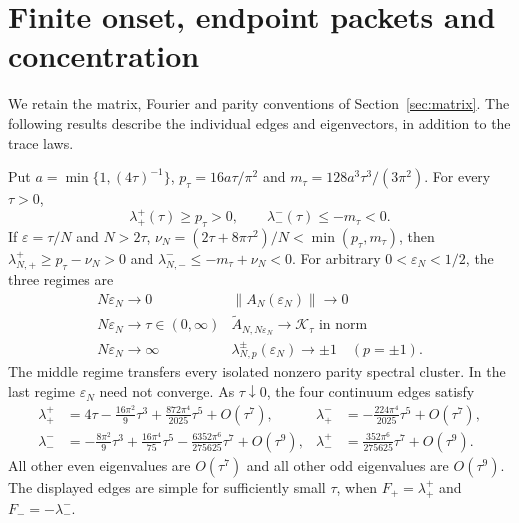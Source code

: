 \section{Finite onset, endpoint packets and concentration}
\label{sec:packets}\label{sec:thirdregime}

We retain the matrix, Fourier and parity conventions of
Section~\ref{sec:matrix}. The following results describe the individual
edges and eigenvectors, in addition to the trace laws.

\begin{theorem}
\label{thm:signed-bounds}\label{cor:sharp}
Put $a=\min\{1,(4\tau)^{-1}\}$,
$p_\tau=16a\tau/\pi^2$ and $m_\tau=128a^3\tau^3/(3\pi^2)$.
For every $\tau>0$,
\begin{equation}\label{eq:3.7}
 \lambda_+^+(\tau)\ge p_\tau>0,\qquad
 \lambda_-^-(\tau)\le-m_\tau<0.
\end{equation}
If $\varepsilon=\tau/N$ and
$N>2\tau$, $\nu_N=(2\tau+8\pi\tau^2)/N<\min(p_\tau,m_\tau)$, then
$\lambda_{N,+}^+\ge p_\tau-\nu_N>0$ and
$\lambda_{N,-}^-\le-m_\tau+\nu_N<0$.
For arbitrary $0<\varepsilon_N<1/2$, the three regimes are
\begin{equation}\label{eq:v6:5.6}
\begin{array}{c|c}
N\varepsilon_N\longrightarrow0&\|A_N(\varepsilon_N)\|\longrightarrow0\\
N\varepsilon_N\longrightarrow\tau\in(0,\infty)&
 \widetilde A_{N,N\varepsilon_N}\longrightarrow\mathcal K_\tau
 \text{ in norm}\\
N\varepsilon_N\longrightarrow\infty&
 \lambda_{N,p}^{\pm}(\varepsilon_N)\longrightarrow\pm1
 \quad(p=\pm1).
\end{array}
\end{equation}
The middle regime transfers every isolated nonzero parity spectral
cluster. In the last regime $\varepsilon_N$ need not converge.
As $\tau\downarrow0$, the four continuum edges satisfy
\begin{align}
\lambda_+^+&=4\tau-\frac{16\pi^2}{9}\tau^3+
 \frac{872\pi^4}{2025}\tau^5+O(\tau^7),&
\lambda_+^-&=-\frac{224\pi^4}{2025}\tau^5+O(\tau^7),
\label{eq:small-even}\\
\lambda_-^-&=-\frac{8\pi^2}{9}\tau^3+
 \frac{16\pi^4}{75}\tau^5-\frac{6352\pi^6}{275625}\tau^7+O(\tau^9),&
\lambda_-^+&=\frac{352\pi^6}{275625}\tau^7+O(\tau^9).
\label{eq:small-odd}
\end{align}
All other even eigenvalues are $O(\tau^7)$ and all other odd eigenvalues
are $O(\tau^9)$. The displayed edges are simple for sufficiently small
$\tau$, when $F_+=\lambda_+^+$ and $F_-=-\lambda_-^-$.
\end{theorem}
